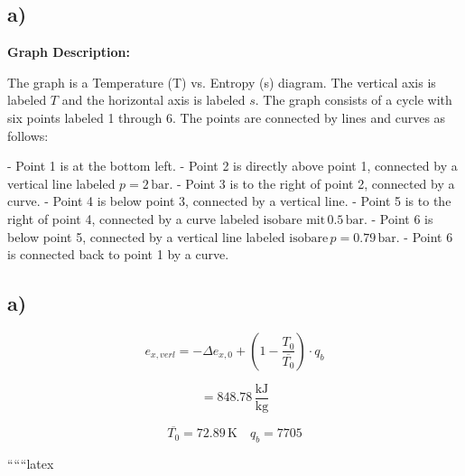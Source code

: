 

\subsection*{a)}

\begin{center}
\textbf{Graph Description:}
\end{center}

The graph is a Temperature (T) vs. Entropy (s) diagram. The vertical axis is labeled \( T \) and the horizontal axis is labeled \( s \). The graph consists of a cycle with six points labeled 1 through 6. The points are connected by lines and curves as follows:

- Point 1 is at the bottom left.
- Point 2 is directly above point 1, connected by a vertical line labeled \( p = 2 \, \text{bar} \).
- Point 3 is to the right of point 2, connected by a curve.
- Point 4 is below point 3, connected by a vertical line.
- Point 5 is to the right of point 4, connected by a curve labeled \( \text{isobare mit} \, 0.5 \, \text{bar} \).
- Point 6 is below point 5, connected by a vertical line labeled \( \text{isobare} \, p = 0.79 \, \text{bar} \).
- Point 6 is connected back to point 1 by a curve.



\subsection*{a)}

\[
e_{x,verl} = -\Delta e_{x,0} + \left( 1 - \frac{T_0}{\overline{T_0}} \right) \cdot q_b
\]

\[
= 848.78 \, \frac{\text{kJ}}{\text{kg}}
\]

\[
\overline{T_0} = 72.89 \, \text{K} \quad q_b = 7705
\]

``````latex